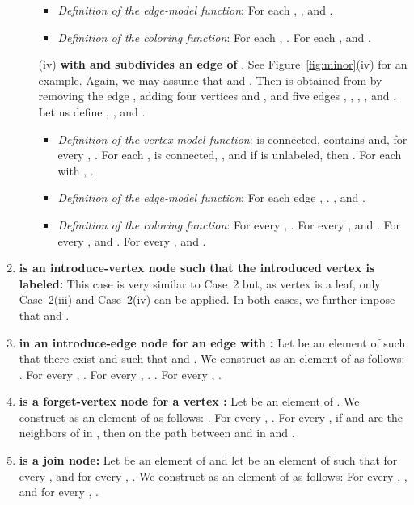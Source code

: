\begin{enumerate}
\begin{itemize}
\begin{itemize}
\item \emph{Definition of the edge-model function}:
For each , , and
  .

\item \emph{Definition of the coloring function}:
  For each , .
  For each ,  and .
\end{itemize}

\medskip
\item[(iv)] \textbf{ with  and  subdivides an edge  of }. See Figure~\ref{fig:minor}(iv) for an example. Again, we may assume that  and .
Then  is obtained from  by removing the edge ,
adding four vertices  and , and five edges , , , , and . Let us define , , and .
\begin{itemize}
\item \emph{Definition of the vertex-model function}:
 is connected, contains  and, for every , .
For each ,  is connected,  , and
 if  is unlabeled, then .
For each  with , .

\item \emph{Definition of the edge-model function}:
For each edge , .
, and
.

\item \emph{Definition of the coloring function}:
For every , .
For every ,  and .
For every ,  and .
For every ,    and .
\end{itemize}
\end{itemize}

\medskip
\item {\bf  is an introduce-vertex node such that the introduced vertex   is labeled:} This case is very similar to Case~2 but, as vertex  is a leaf, only Case~2(iii) and Case~2(iv) can be applied. In both cases, we further impose that   and .

\medskip
\item {\bf  in an introduce-edge node for an edge  with :}
Let  be an element of  such that there exist  and  such that  and .
We construct  as an element of  as follows:
 .
For every , .
For every , .
.
For every , .

\medskip
\item
{\bf  is a forget-vertex node for a vertex :} Let  be an element of .
We construct  as an element of  as follows: .
For every , .
For every , if  and  are the neighbors of  in , then  on the path between  and  in  and .

\medskip
\item
{\bf  is a join node:}
Let  be an element of  and
let  be an element of  such that
for every ,  and
for every , . We construct  as an element of  as follows:
For every , , and
 for every , .

\end{enumerate}





